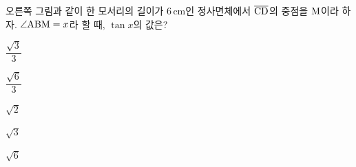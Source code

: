 \noindent\begin{minipage}[t]{0.58\linewidth}\vspace{0pt}\raggedright 오른쪽 그림과 같이 한 모서리의 길이가 $6\,\mathrm{cm}$인 정사면체에서 $\overline{\mathrm{CD}}$의 중점을 $\mathrm{M}$이라 하자. $\angle\mathrm{ABM}=x$라 할 때, $\tan x$의 값은?\end{minipage}\hfill\begin{minipage}[t]{0.4\linewidth}\vspace{0pt}\centering \resizebox{\ifdim\width>\linewidth\linewidth\else\width\fi}{!}{}\end{minipage}\par
\begin{choicesii}{\rule[-3ex]{0pt}{8ex}$\dfrac{\sqrt{3}}{3}$}{\rule[-3ex]{0pt}{8ex}$\dfrac{\sqrt{6}}{3}$}{\rule[-3ex]{0pt}{8ex}$\sqrt{2}$}{\rule[-3ex]{0pt}{8ex}$\sqrt{3}$}{\rule[-3ex]{0pt}{8ex}$\sqrt{6}$}\end{choicesii}
